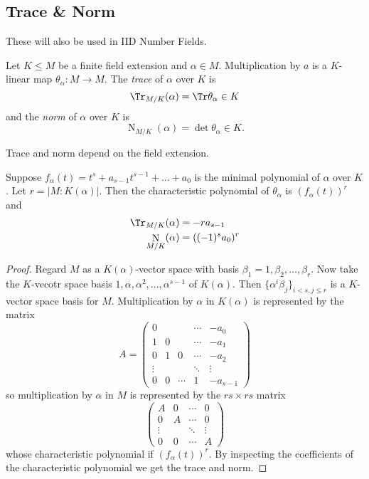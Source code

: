 \documentclass[a4paper]{article}
\DeclareMathOperator{\n}{N}
\begin{document}
\subsection{Trace \& Norm}

These will also be used in IID Number Fields.

\begin{definition}
  Let \(K \leq M\) be a finite field extension and \(\alpha \in M\). Multiplication by \(a\) is a \(K\)-linear map \(\theta_\alpha: M \to M\). The \emph{trace} of \(\alpha\) over \(K\) is
  \[
    \Tr_{M/K}(\alpha) = \Tr \theta_\alpha \in K
  \]
  and the \emph{norm} of \(\alpha\) over \(K\) is
  \[
    \n_{M/K}(\alpha) = \det \theta_\alpha \in K.
  \]
\end{definition}

\begin{note}
  Trace and norm depend on the field extension.
\end{note}

\begin{theorem}
  \label{thm:trace and norm}
  Suppose \(f_\alpha(t) = t^s + a_{s - 1}t^{s - 1} + \dots + a_0\) is the minimal polynomial of \(\alpha\) over \(K\). Let \(r = |M: K(\alpha)|\). Then the characteristic polynomial of \(\theta_\alpha\) is \((f_\alpha(t))^r\) and
  \begin{align*}
    \Tr_{M/K}(\alpha) &= -r a_{s-1} \\
    \n_{M/K}(\alpha) &= ((-1)^s a_0)^r
  \end{align*}
\end{theorem}

\begin{proof}
  Regard \(M\) as a \(K(\alpha)\)-vector space with basis \(\beta_1 = 1, \beta_2, \dots, \beta_r\). Now take the \(K\)-vecotr space basis \(1, \alpha, \alpha^2, \dots, \alpha^{s - 1}\) of \(K(\alpha)\). Then \(\{\alpha^i \beta_j\}_{i < s, j \leq r}\) is a \(K\)-vector space basis for \(M\). Multiplication by \(\alpha\) in \(K(\alpha)\) is represented by the matrix
    \[
      A =
      \begin{pmatrix}
        0 & & & \cdots & -a_0 \\
        1 & 0 & & \cdots & -a_1 \\
        0 & 1 & 0 & \cdots & -a_2 \\
        \vdots & & & \ddots & \vdots \\
        0 & 0 & \cdots & 1 & -a_{s - 1}
      \end{pmatrix}
    \]
    so multiplication by \(\alpha\) in \(M\) is represented by the \(rs \times rs\) matrix
    \[
      \begin{pmatrix}
        A & 0 & \cdots & 0 \\
        0 & A & \cdots & 0 \\
        \vdots & & \ddots & \vdots \\
        0 & 0 & \cdots & A
      \end{pmatrix}
    \]
    whose characteristic polynomial if \((f_\alpha(t))^r\). By inspecting the coefficients of the characteristic polynomial we get the trace and norm.
\end{proof}
\end{document}
